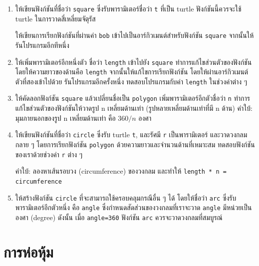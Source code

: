\begin{enumerate}

\item ให้เขียนฟังก์ชันที่ชื่อว่า {\tt square} ซึ่งรับพารามิเตอร์ชื่อว่า {\tt t} ที่เป็น turtle 
ฟังก์ชันนี้ควรจะใช้ turtle ในการวาดสี่เหลี่ยมจัตุรัส

ให้เขียนการเรียกฟังก์ชันที่ผ่านค่า {\tt bob} เข้าไปเป็นอาร์กิวเมนต์สำหรับฟังก์ชัน {\tt square}
จากนั้นให้รันโปรแกรมอีกทีหนึ่ง

\item ให้เพิ่มพารามิเตอร์อีกหนึ่งตัว ชื่อว่า {\tt length} เข้าไปยัง {\tt square}
ทำการแก้ไขส่วนตัวของฟังก์ชันโดยให้ความยาวของด้านคือ {\tt length} จากนั้นให้แก้ไขการเรียกฟังก์ชัน
โดยให้ผ่านอาร์กิวเมนต์ตัวที่สองเข้าไปด้วย รันโปรแกรมอีกครั้งหนึ่ง ทดสอบโปรแกรมกับค่า {\tt length}
ในช่วงค่าต่าง ๆ

\item ให้คัดลอกฟังก์ชัน {\tt square} แล้วเปลี่ยนชื่อเป็น {\tt polygon}
เพิ่มพารามิเตอร์อีกตัวชื่อว่า {\tt n} ทำการแก้ไขส่วนตัวของฟังก์ชันให้วาดรูป n เหลี่ยมด้านเท่า 
(รูปหลายเหลี่ยมด้านเท่าที่มี n ด้าน)
คำใบ้: มุมภายนอกของรูป n เหลี่ยมด้านเท่า คือ $360/n$ องศา  
 
 

\item ให้เขียนฟังก์ชันที่ชื่อว่า {\tt circle} ซึ่งรับ turtle {\tt t}, และรัศมี {\tt r} เป็นพารามิเตอร์
และวาดวงกลมกลาย ๆ โดยการเรียกฟังก์ชัน {\tt polygon} ด้วยความยาวและจำนวนด้านที่เหมาะสม
ทดสอบฟังก์ชันของเราด้วยช่วงค่า {\tt r} ต่าง ๆ
 
 

คำใบ้: ลองหาเส้นรอบวง (circumference) ของวงกลม และทำให้ {\tt length * n = circumference}

\item ให้สร้างฟังก์ชัน {\tt circle} ที่จะสามารถใช้ครอบคลุมกรณีอื่น ๆ ได้ โดยให้ชื่อว่า {\tt arc}
ซึ่งรับพารามิเตอร์อีกตัวหนึ่ง คือ {\tt angle} ซึ่งกำหนดสัดส่วนของวงกลมที่เราจะวาด
{\tt angle} มีหน่วยเป็นองศา (degree)  ดังนั้น เมื่อ {\tt angle=360} ฟังก์ชัน {\tt arc} 
ควรจะวาดวงกลมที่สมบูรณ์


\end{enumerate}


\section{การห่อหุ้ม} %

